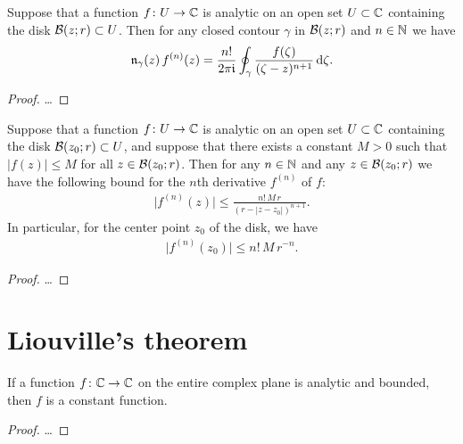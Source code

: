 \begin{theorem}
  \label{thm:cauchy_formula_derivative}
  Suppose that a function $f \colon U \to \bC$ is analytic on an open
  set $U \subset \bC$ containing the disk $\DiskRC{r}{z} \subset U$.
  Then for any closed contour $\gamma$ in $\DiskRC{r}{z}$
  and $n \in \bN$ we have
  \begin{align*}
    \windN{\gamma}{z} \, f^{(n)}(z)
      = \frac{n!}{2\pi \ii} \oint_\gamma \frac{f(\zeta)}{(\zeta - z)^{n+1}} \, \ud \zeta .
  \end{align*}
\end{theorem}
\begin{proof}
  \ldots
\end{proof}

\begin{lemma}
  \label{lem:cauchy_derivative_estimate}
  Suppose that a function $f \colon U \to \bC$ is analytic on an open
  set $U \subset \bC$ containing the disk $\DiskRC{r}{z_0} \subset U$,
  and suppose that there exists a constant $M>0$ such that
  $|f(z)| \le M$ for all $z \in \DiskRC{r}{z_0}$.
  Then for any $n \in \bN$ and any $z \in \DiskRC{r}{z_0}$ we have
  the following bound for the $n$th derivative $f^{(n)}$ of $f$:
  \begin{align*}
    \big| f^{(n)}(z) \big| \le \frac{n! \, M \, r}{( r - |z-z_0| )^{n+1}} .
  \end{align*}
  In particular, for the center point $z_0$ of the disk, we have
  \begin{align*}
    \big| f^{(n)}(z_0) \big| \le n! \, M \, r^{-n} .
  \end{align*}
\end{lemma}
\begin{proof}
  \ldots
\end{proof}



\section{Liouville's theorem}

\begin{theorem}
  \label{thm:liouville}
  If a function $f \colon \bC \to \bC$ on the entire complex plane
  is analytic and bounded, then $f$ is a constant function.
\end{theorem}
\begin{proof}
  \ldots
\end{proof}



